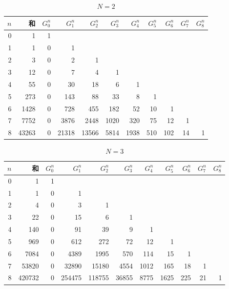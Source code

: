 {	\begin{table}[htbp] %
		\begin{center}\begin{tabular}{r|r|rrrrrrrrr} \hline
$n$ & 和 & $G^n_0$ & $G^n_1$ & $G^n_2$ & $G^n_3$ & $G^n_4$ & $G^n_5$ & $G^n_6$ & $G^n_7$ & $G^n_8$ \\\hline
0 & 1 & 1 \\
1 & 1 & 0 & 1 \\
2 & 3 & 0 & 2 & 1 \\
3 & 12 & 0 & 7 & 4 & 1 \\
4 & 55 & 0 & 30 & 18 & 6 & 1 \\
5 & 273 & 0 & 143 & 88 & 33 & 8 & 1 \\
6 & 1428 & 0 & 728 & 455 & 182 & 52 & 10 & 1 \\
7 & 7752 & 0 & 3876 & 2448 & 1020 & 320 & 75 & 12 & 1 \\
8 & 43263 & 0 & 21318 & 13566 & 5814 & 1938 & 510 & 102 & 14 & 1 \\
\hline
		\end{tabular}\end{center}
		\caption{$N=2$}\label{table:Nが2の場合}
	\end{table} %

	\begin{table}[htbp] %
		\begin{center}\begin{tabular}{r|r|rrrrrrrrr} \hline
$n$ & 和 & $G^n_0$ & $G^n_1$ & $G^n_2$ & $G^n_3$ & $G^n_4$ & $G^n_5$ & $G^n_6$ & $G^n_7$ & $G^n_8$ \\\hline
0 & 1 & 1 \\
1 & 1 & 0 & 1 \\
2 & 4 & 0 & 3 & 1 \\
3 & 22 & 0 & 15 & 6 & 1 \\
4 & 140 & 0 & 91 & 39 & 9 & 1 \\
5 & 969 & 0 & 612 & 272 & 72 & 12 & 1 \\
6 & 7084 & 0 & 4389 & 1995 & 570 & 114 & 15 & 1 \\
7 & 53820 & 0 & 32890 & 15180 & 4554 & 1012 & 165 & 18 & 1 \\
8 & 420732 & 0 & 254475 & 118755 & 36855 & 8775 & 1625 & 225 & 21 & 1 \\
\hline
		\end{tabular}\end{center}
		\caption{$N=3$}\label{table:Nが3の場合}
	\end{table} %

}\endgroup %
